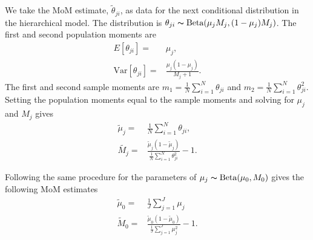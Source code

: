 \documentclass[11pt,reqno]{amsart}
\begin{document}
We take the MoM estimate, $\tilde{\theta}_{ji}$, as data for the next conditional distribution in the hierarchical model. The distribution is $\theta_{ji} \thicksim \text{Beta}(\mu_jM_j, (1-\mu_j)M_j)$. The first and second population moments are
\begin{eqnarray}
	E[\theta_{ji}] =& \mu_j,\\
	\text{Var}[\theta_{ji}] =& \frac{\mu_j(1-\mu_j)} { M_j + 1 }.
\end{eqnarray}
The first and second sample moments are $m_1 = \frac{1}{N}\sum_{i=1}^N \theta_{ji}$ and $m_2 = \frac{1}{N}\sum_{i=1}^N \theta_{ji}^2$. Setting the population moments equal to the sample moments and solving for $\mu_j$ and $M_j$ gives
\begin{eqnarray}
	\tilde{\mu}_j =& \frac{1}{N} \sum_{i=1}^N \theta_{ji}, \\
	\tilde{M_j} =& \frac{ \tilde{\mu}_j (1 - \tilde{\mu}_j ) } { \frac{1}{N} \sum_{i=1}^N \theta_{ji}^2 } -1.
\end{eqnarray}

Following the same procedure for the parameters of $\mu_j \thicksim \text{Beta}(\mu_0, M_0)$ gives the following MoM estimates
\begin{eqnarray}
	\tilde{\mu}_0 =& \frac{1}{J} \sum_{j=1}^J \mu_j \\
	\tilde{M}_0 =& \frac{ \tilde{\mu}_0 (1 - \tilde{\mu}_0 ) } {\frac{1}{J} \sum_{j=1}^J \mu_j^2 } -1.
\end{eqnarray}





\end{document}
